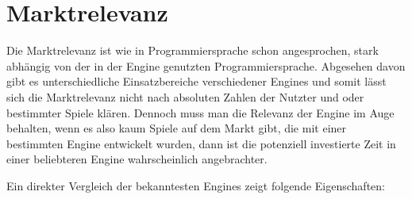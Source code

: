 \section{Marktrelevanz}
Die Marktrelevanz ist wie in {Programmiersprache} schon angesprochen, stark abhängig von der in der Engine genutzten Programmiersprache. Abgesehen davon gibt es unterschiedliche Einsatzbereiche verschiedener Engines und somit lässt sich die Marktrelevanz nicht nach absoluten Zahlen der Nutzter und oder bestimmter Spiele klären. Dennoch muss man die Relevanz der Engine im Auge behalten, wenn es also kaum Spiele auf dem Markt gibt, die mit einer bestimmten Engine entwickelt wurden, dann ist die potenziell investierte Zeit in einer beliebteren Engine wahrscheinlich angebrachter.



\newpage

Ein direkter Vergleich der bekanntesten Engines zeigt folgende Eigenschaften:


